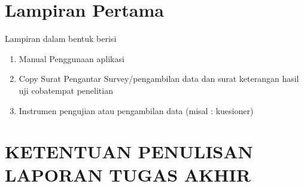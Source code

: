 \chapter*{Lampiran Pertama}
\label{app:pertama}
Lampiran dalam bentuk berisi
\begin{enumerate}[noitemsep]
	\item  Manual Penggunaan aplikasi
	\item Copy Surat Pengantar Survey/pengambilan data dan surat keterangan hasil uji cobatempat penelitian
	\item Instrumen pengujian atau pengambilan data (misal : kuesioner) 
\end{enumerate}


\chapter*{KETENTUAN PENULISAN LAPORAN TUGAS AKHIR }
\label{app:kedua}

